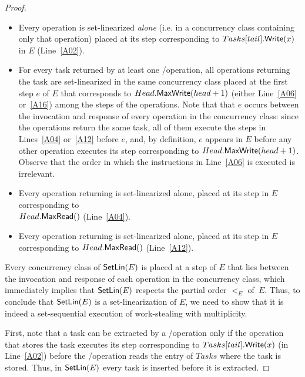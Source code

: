 \begin{proof}
\begin{itemize}

\item Every \Put operation is set-linearized \emph{alone} (i.e. in a concurrency class containing only that operation) placed at its step corresponding to \(Tasks[tail].{\sf \small Write}(x)\) in \(E\) (Line~\ref{A02}).

\item For every task returned by at least one \Take/\Steal operation, all operations returning the task are set-linearized in the same concurrency class placed at the first step \(e\) of \(E\) that corresponds to \(Head.{\sf \small MaxWrite}(head+1)\) (either Line~\ref{A06} or~\ref{A16}) among the steps of the operations.  Note that that \(e\) occurs between the invocation and response of every operation in the concurrency class: since the operations return the same task, all of them execute the \MaxR steps in Lines~\ref{A04} or~\ref{A12} before \(e\), and, by definition, \(e\) appears in \(E\) before any other operation executes its step corresponding to \(Head.{\sf \small MaxWrite}(head+1)\).  Observe that the order in which the instructions in Line~\ref{A06} is executed is irrelevant.

\item Every \Take operation returning \epty is set-linearized alone, placed at its step in \(E\) corresponding to\\ \(Head.{\sf \small MaxRead}()\) (Line~\ref{A04}).

\item Every \Steal operation returning \epty is set-linearized alone, placed at its step in \(E\) corresponding to \(Head.{\sf \small MaxRead}()\) (Line~\ref{A12}).

\end{itemize}

Every concurrency class of \({\sf \small SetLin}(E)\) is placed at a step of \(E\) that lies between the invocation and response of each operation in the concurrency class, which immediately implies that \({\sf \small SetLin}(E)\) respects the partial order \(<_E\) of~\(E\). Thus, to conclude that \({\sf \small SetLin}(E)\) is a set-linearization of \(E\), we need to show that it is indeed a set-sequential execution of work-stealing with multiplicity.

First, note that a task can be extracted by a \Take/\Steal operation only if the \Put operation that stores the task executes its step corresponding to \(Tasks[tail].{\sf \small Write}(x)\) (in Line~\ref{A02}) before the \Take/\Steal operation reads the entry of \(Tasks\) where the task is stored.  Thus, in \({\sf \small SetLin}(E)\) every task is inserted before it is extracted.


\end{proof}
